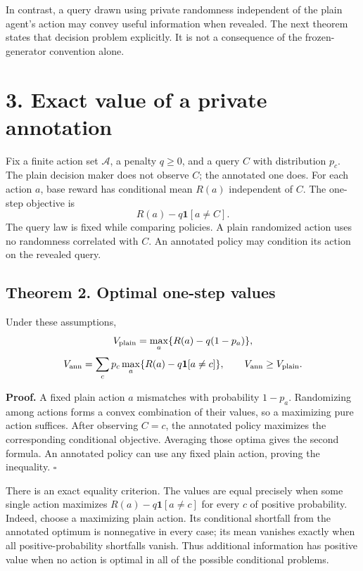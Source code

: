 \documentclass[
  11pt,
  letterpaper,
]{article}
\begin{document}
In contrast, a query drawn using private randomness independent of the
plain agent's action may convey useful information when revealed. The
next theorem states that decision problem explicitly. It is not a
consequence of the frozen-generator convention alone.

\section{3. Exact value of a private
annotation}\label{exact-value-of-a-private-annotation}

Fix a finite action set \(\mathcal A\), a penalty \(q\geq0\), and a
query \(C\) with distribution \(p_c\). The plain decision maker does not
observe \(C\); the annotated one does. For each action \(a\), base
reward has conditional mean \(R(a)\) independent of \(C\). The one-step
objective is \[
                       R(a)-q\mathbf1[a\ne C].
\] The query law is fixed while comparing policies. A plain randomized
action uses no randomness correlated with \(C\). An annotated policy may
condition its action on the revealed query.

\subsection{Theorem 2. Optimal one-step
values}\label{theorem-2.-optimal-one-step-values}

Under these assumptions, \[
 V_{\rm plain}=\max_a\{R(a)-q(1-p_a)\},
\] \[
 V_{\rm ann}=\sum_c p_c\max_a\{R(a)-q\mathbf1[a\ne c]\},
 \qquad V_{\rm ann}\geq V_{\rm plain}.
\]

\textbf{Proof.} A fixed plain action \(a\) mismatches with probability
\(1-p_a\). Randomizing among actions forms a convex combination of their
values, so a maximizing pure action suffices. After observing \(C=c\),
the annotated policy maximizes the corresponding conditional objective.
Averaging those optima gives the second formula. An annotated policy can
use any fixed plain action, proving the inequality. \hfill\(\square\)

There is an exact equality criterion. The values are equal precisely
when some single action maximizes \(R(a)-q\mathbf1[a\ne c]\) for every
\(c\) of positive probability. Indeed, choose a maximizing plain action.
Its conditional shortfall from the annotated optimum is nonnegative in
every case; its mean vanishes exactly when all positive-probability
shortfalls vanish. Thus additional information has positive value when
no action is optimal in all of the possible conditional problems.
\end{document}
